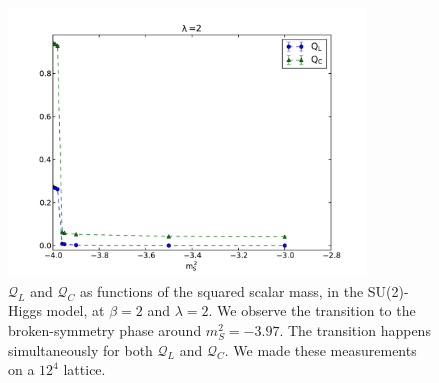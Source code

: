 \begin{figure}[thb] 
\begin{center}
  \includegraphics[width=9.5cm,clip]{pics/SU2H_jump_Q}  
  \end{center}
  \caption{$\mathcal Q_L$ and $\mathcal Q_C$ as functions of the squared scalar mass, in the SU(2)-Higgs model, at $\beta =2$ and $\lambda = 2$. We observe the transition to the broken-symmetry phase around $m_S^2 = -3.97$. The transition happens simultaneously for both $\mathcal Q_L$ and $\mathcal Q_C$. We made these measurements on a $12^4$ lattice.}
  \label{SU2H_jump_Q}
\end{figure}


